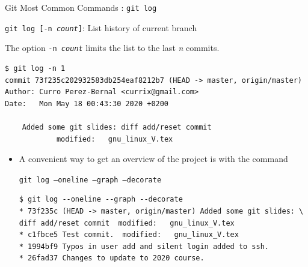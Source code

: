 \begin{frame}[t,fragile]{Git Most Common Commands : \alert{\texttt{git log}}}
      \begin{block}{\alert{\texttt{git log [-n \emph{count}]}}: List history of current branch}
        {\scriptsize
          The option \texttt{-n \emph{count}} limits the list to the last \emph{n} commits. 
          \begin{lstlisting}
$ git log -n 1
commit 73f235c202932583db254eaf8212b7 (HEAD -> master, origin/master)
Author: Curro Perez-Bernal <currix@gmail.com>
Date:   Mon May 18 00:43:30 2020 +0200

    Added some git slides: diff add/reset commit
            modified:   gnu_linux_V.tex
\end{lstlisting}
\begin{itemize}
  \item A convenient way to get an overview of the project is with  the command

\texttt{git log --oneline --graph --decorate}

          \begin{lstlisting}
$ git log --oneline --graph --decorate
* 73f235c (HEAD -> master, origin/master) Added some git slides: \
diff add/reset commit  modified:   gnu_linux_V.tex
* c1fbce5 Test commit.  modified:   gnu_linux_V.tex
* 1994bf9 Typos in user add and silent login added to ssh.
* 26fad37 Changes to update to 2020 course.
\end{lstlisting}
\end{itemize}
}
\end{block}  
  
\end{frame}
